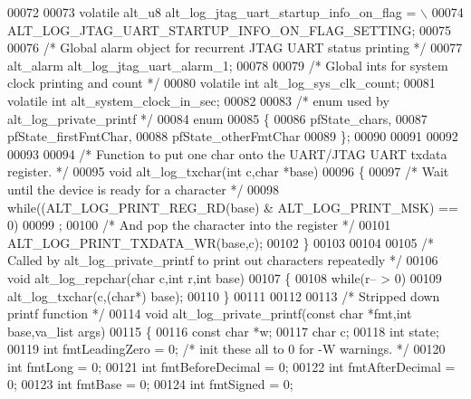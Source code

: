 \begin{DoxyCode}
00072 
00073 \textcolor{keyword}{volatile} alt_u8 alt\_log\_jtag\_uart\_startup\_info\_on\_flag = \(\backslash\)
00074   ALT\_LOG\_JTAG\_UART\_STARTUP\_INFO\_ON\_FLAG\_SETTING;
00075 
00076 \textcolor{comment}{/* Global alarm object for recurrent JTAG UART status printing */}
00077 alt_alarm alt\_log\_jtag\_uart\_alarm\_1;
00078 
00079 \textcolor{comment}{/* Global ints for system clock printing and count */}
00080 \textcolor{keyword}{volatile} \textcolor{keywordtype}{int} alt\_log\_sys\_clk\_count;
00081 \textcolor{keyword}{volatile} \textcolor{keywordtype}{int} alt\_system\_clock\_in\_sec;
00082 
00083 \textcolor{comment}{/* enum used by alt\_log\_private\_printf */}
00084 \textcolor{keyword}{enum}
00085 \{
00086   pfState\_chars,
00087   pfState\_firstFmtChar,
00088   pfState\_otherFmtChar
00089 \};
00090 
00091 
00092 
00093 
00094 \textcolor{comment}{/* Function to put one char onto the UART/JTAG UART txdata register. */}
00095 \textcolor{keywordtype}{void} alt\_log\_txchar(\textcolor{keywordtype}{int} c,\textcolor{keywordtype}{char} *base)
00096 \{
00097   \textcolor{comment}{/* Wait until the device is ready for a character */}
00098   \textcolor{keywordflow}{while}((ALT\_LOG\_PRINT\_REG\_RD(base) & ALT\_LOG\_PRINT\_MSK) == 0)
00099     ;
00100   \textcolor{comment}{/* And pop the character into the register */}
00101   ALT\_LOG\_PRINT\_TXDATA\_WR(base,c);
00102 \}
00103 
00104 
00105 \textcolor{comment}{/* Called by alt\_log\_private\_printf to print out characters repeatedly */}
00106 \textcolor{keywordtype}{void} alt\_log\_repchar(\textcolor{keywordtype}{char} c,\textcolor{keywordtype}{int} r,\textcolor{keywordtype}{int} base)
00107 \{
00108   \textcolor{keywordflow}{while}(r-- > 0)
00109     alt\_log\_txchar(c,(\textcolor{keywordtype}{char}*) base);
00110 \}
00111 
00112 
00113 \textcolor{comment}{/* Stripped down printf function */}
00114 \textcolor{keywordtype}{void} alt\_log\_private\_printf(\textcolor{keyword}{const} \textcolor{keywordtype}{char} *fmt,\textcolor{keywordtype}{int} base,va\_list args)
00115   \{
00116   \textcolor{keyword}{const} \textcolor{keywordtype}{char} *w;
00117   \textcolor{keywordtype}{char} c;
00118   \textcolor{keywordtype}{int} state;
00119   \textcolor{keywordtype}{int} fmtLeadingZero = 0; \textcolor{comment}{/* init these all to 0 for -W warnings. */}
00120   \textcolor{keywordtype}{int} fmtLong = 0;
00121   \textcolor{keywordtype}{int} fmtBeforeDecimal = 0;
00122   \textcolor{keywordtype}{int} fmtAfterDecimal = 0;
00123   \textcolor{keywordtype}{int} fmtBase = 0;
00124   \textcolor{keywordtype}{int} fmtSigned = 0;

\end{DoxyCode}
